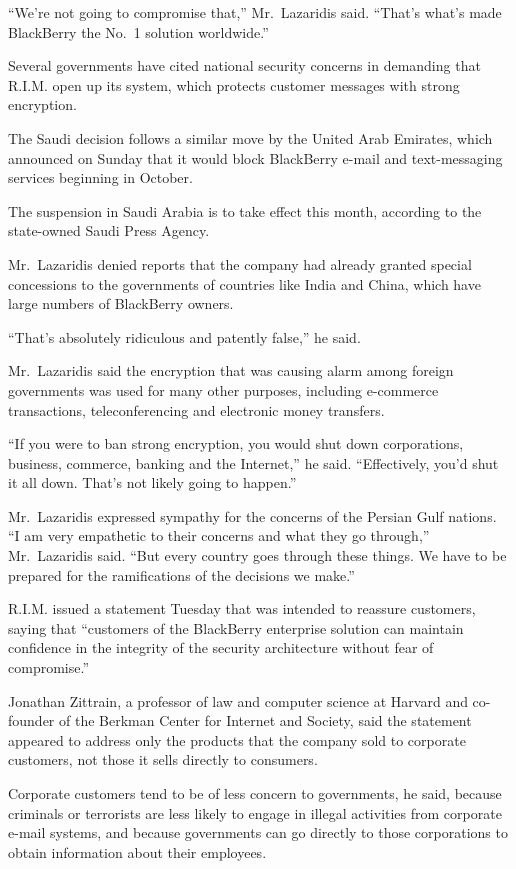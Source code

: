 ﻿\documentclass[12pt]{article}
\begin{document}
``We're not going to compromise that,'' Mr.~Lazaridis said. ``That's what's made BlackBerry the
No.~1 solution worldwide.''

Several governments have cited national security concerns in demanding that R.I.M. open up its
system, which protects customer messages with strong encryption.

The Saudi decision follows a similar move by the United Arab Emirates, which announced on Sunday
that it would block BlackBerry e-mail and text-messaging services beginning in October.

The suspension in Saudi Arabia is to take effect this month, according to the state-owned Saudi
Press Agency.

Mr.~Lazaridis denied reports that the company had already granted special concessions to the
governments of countries like India and China, which have large numbers of BlackBerry owners.

``That's absolutely ridiculous and patently false,'' he said.

Mr.~Lazaridis said the encryption that was causing alarm among foreign governments was used for many
other purposes, including e-commerce transactions, teleconferencing and electronic money transfers.

``If you were to ban strong encryption, you would shut down corporations, business, commerce,
banking and the Internet,'' he said. ``Effectively, you'd shut it all down. That's not likely going
to happen.''

Mr.~Lazaridis expressed sympathy for the concerns of the Persian Gulf nations. ``I am very
empathetic to their concerns and what they go through,'' Mr.~Lazaridis said. ``But every country
goes through these things. We have to be prepared for the ramifications of the decisions we make.''

R.I.M. issued a statement Tuesday that was intended to reassure customers, saying that ``customers
of the BlackBerry enterprise solution can maintain confidence in the integrity of the security
architecture without fear of compromise.''

Jonathan Zittrain, a professor of law and computer science at Harvard and co-founder of the Berkman
Center for Internet and Society, said the statement appeared to address only the products that the
company sold to corporate customers, not those it sells directly to consumers.

Corporate customers tend to be of less concern to governments, he said, because criminals or
terrorists are less likely to engage in illegal activities from corporate e-mail systems, and
because governments can go directly to those corporations to obtain information about their
employees.
\end{document}
